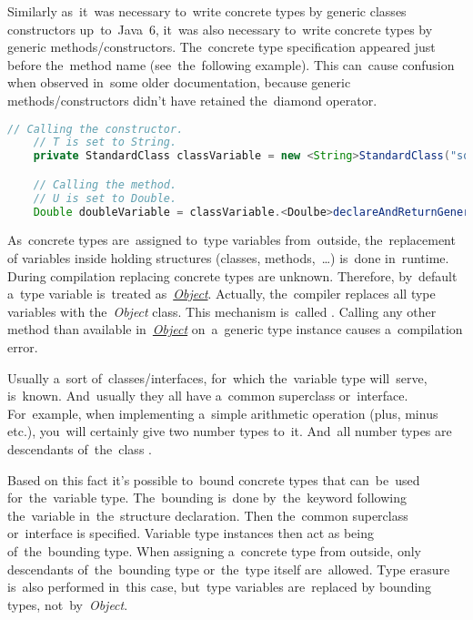 \note Similarly as~it~was necessary to~write concrete types by generic classes constructors up~to~Java~6, it~was also necessary to~write concrete types by generic methods/constructors.
The~concrete type specification appeared just before the~method name (see~the~following example).
This can~cause confusion when observed in~some older documentation, because generic methods/constructors didn't have retained the~diamond operator.

\begin{lstlisting}[language=Java]
    // Calling the constructor.
    // T is set to String.
    private StandardClass classVariable = new <String>StandardClass("some string");

    // Calling the method.
    // U is set to Double.
    Double doubleVariable = classVariable.<Doulbe>declareAndReturnGenericType(3.14);
\end{lstlisting}

\label{javagenericsbound}
As~concrete types are~assigned to~type variables from~outside, the~replacement of variables inside holding structures (classes, \mbox{methods, \dots)} is~done in~runtime.
During compilation replacing concrete types are unknown.
Therefore, by~default a~type variable is~treated as~\hyperref[javaobject]{\textit{Object}}.
Actually, the~compiler replaces all type variables with \mbox{the \textit{Object}} class.
This mechanism is~called .
Calling any other method than available in~\hyperref[javaobject]{\textit{Object}} on~a~generic type instance causes a~compilation error.

Usually a~sort of~classes/interfaces, for~which the~variable type will~serve, is~known.
And~usually they all have a~common superclass or~interface.
For~example, when implementing a~simple arithmetic operation (plus, minus etc.), you~will certainly give two number types to~it.
And~all number types are descendants of~the~class .

Based on this fact it's possible to~bound concrete types that can~be~used for~the~variable type.
The~bounding is~done by~the~keyword  following the~variable in~the~structure declaration.
Then the~common superclass or~interface is specified.
Variable type instances then act as being of~the~bounding type.
When assigning a~concrete type from outside, only descendants of~the~bounding type or~the~type itself are~allowed.
Type erasure is~also performed in~this case, but~type variables are~replaced by bounding types, \mbox{not by \textit{Object}}.

